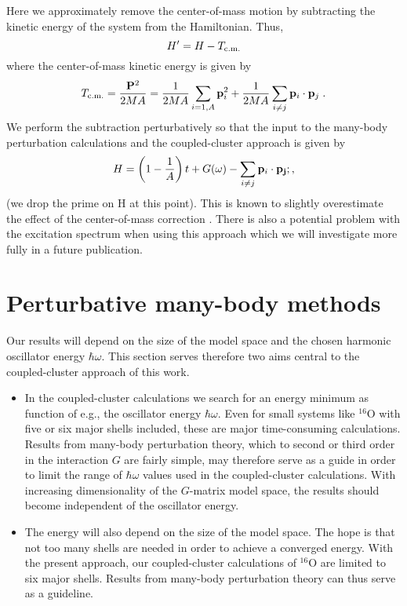 Here we approximately remove the center-of-mass motion by 
subtracting the kinetic energy of the system from the Hamiltonian. Thus, 
\begin{equation}
H'=H-T_{\rm c.m.}
\end{equation}
where the center-of-mass kinetic energy is given by
\begin{equation}
T_{\rm c.m.}=\frac{{\bf P}^2}{2MA}=\frac{1}{2MA}\sum_{i=1,A}{\bf p}_i^2
+\frac{1}{2MA}\sum_{i \ne j} {\bf p}_i\cdot{\bf p}_j\;.
\end{equation}
We perform the subtraction perturbatively so that the input to the 
many-body perturbation calculations and the coupled-cluster approach is 
given by
\begin{equation}
H=\left(1-\frac{1}{A}\right)t+G(\omega)-\sum_{i\ne j}{\bf p}_i\cdot {\bf p_j};,
\end{equation}
(we drop the prime on H at this point). 
This is known to slightly overestimate the effect of the center-of-mass 
correction \cite{kum78}. There is also a potential problem with the 
excitation spectrum when using this approach which we will investigate
more fully in a future publication. 

\section{Perturbative many-body methods}
\label{sec:mbpt}
 Our results will depend on the size of the model space and the chosen harmonic
oscillator energy $\hbar\omega$.
This section serves therefore two aims central to the coupled-cluster approach of this work.
\begin{itemize}
\item In the coupled-cluster calculations we search for an energy
minimum as function of e.g., the oscillator energy $\hbar\omega$. Even for small systems 
like  $^{16}$O with five or six 
major shells included, these are major time-consuming calculations.
Results from many-body perturbation theory, which to second or third order 
in the interaction $G$ are fairly
simple, may therefore serve as a guide in order to limit the range of $\hbar\omega$ values
used in the coupled-cluster calculations.
With increasing dimensionality of the $G$-matrix model space, the results should become
independent of the oscillator energy.
\item  The energy will also depend on the size of the model space. The hope is that not too
many shells are needed in order to achieve a converged energy. 
With the  present approach, our 
coupled-cluster calculations of  
$^{16}$O are limited to six major shells.
Results from many-body perturbation theory can thus serve as a guideline.
\end{itemize}
  
